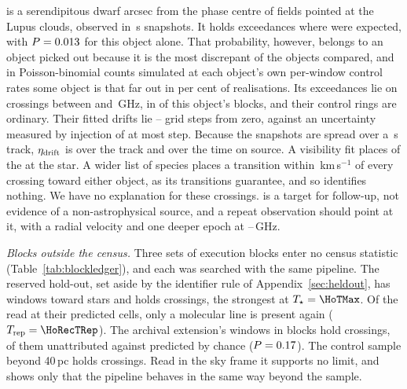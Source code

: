 \BkAlmaName{} is a serendipitous dwarf \TwPbJx{} arcsec from the phase
centre of fields pointed at the Lupus clouds, observed in \TwOnSrcJx\,s
snapshots. It holds \TwNExcJx{} exceedances where \TwExpCtrlJx{} were
expected, with $P=0.013$ for this object alone. That probability,
however, belongs to an object picked out because it is the most discrepant of
the \TwLookNStarCtrl{} objects compared, and in Poisson-binomial counts
simulated at each object's own per-window control rates some object is that
far out in \TwLookPctCtrl{} per cent of realisations. Its
\TwNExcJxWord{} exceedances lie on \TwJxNCrossExcWord{} crossings between
\TwJxExcBandLo{} and \TwJxExcBandHi\,GHz, in \TwJxNBlockExcWord{} of this
object's \TwJxNBlockWord{} blocks, and their control rings are ordinary.
Their fitted drifts lie \TwJxStepLo--\TwJxStepHi{} grid steps from zero,
against an uncertainty measured by injection of at most \TwJxStepErr{} step.
Because the snapshots are spread over a \TwJxSpanS\,s track,
$\eta_{\rm drift}$ is \TwJxEtaSpanRange{} over the track and \TwJxEtaOnRange{}
over the time on source. A visibility fit places \TwJxNLocalExcWord{} of the
\TwJxNCrossExcWord{} at the star. A wider list of \TwWideNSpecies{} species
places a transition within \TwWideDvMax\,km\,s$^{-1}$ of every crossing
toward either object, as its \TwWideNTrans{} transitions guarantee, and so
identifies nothing. We have no explanation for these crossings. \BkAlmaName{}
is a target for follow-up, not evidence of a non-astrophysical source, and a
repeat observation should point at it, with a radial velocity and one deeper
epoch at \TwJxExcBandLo--\TwJxExcBandHi\,GHz.

\label{sec:holdoutsearch}%
\emph{Blocks outside the census.} Three sets of execution blocks enter no
census statistic (Table~\ref{tab:blockledger}), and each was searched with
the same pipeline. The reserved hold-out, set aside by the identifier rule
of Appendix~\ref{sec:heldout}, has \HoNWin{} windows toward \HoNStar{} stars
and holds \HoNCross{} crossings, the strongest at $T_\star=\HoTMax$. Of the \HoNTested{} read at their predicted
cells, only a molecular line is present again ($T_{\rm rep}=\HoRecTRep$). The
archival extension's \LdgExtWin{} windows in \LdgExtEB{} blocks hold
\QxObsCross{} crossings, \QxObsUnattr{} of them unattributed against
\QxLam{} predicted by chance ($P=0.17$). The control sample beyond
40\,pc holds \OosNCross{} crossings. Read in the sky frame it supports no
limit, and shows only that the pipeline behaves in the same way beyond the
sample.

